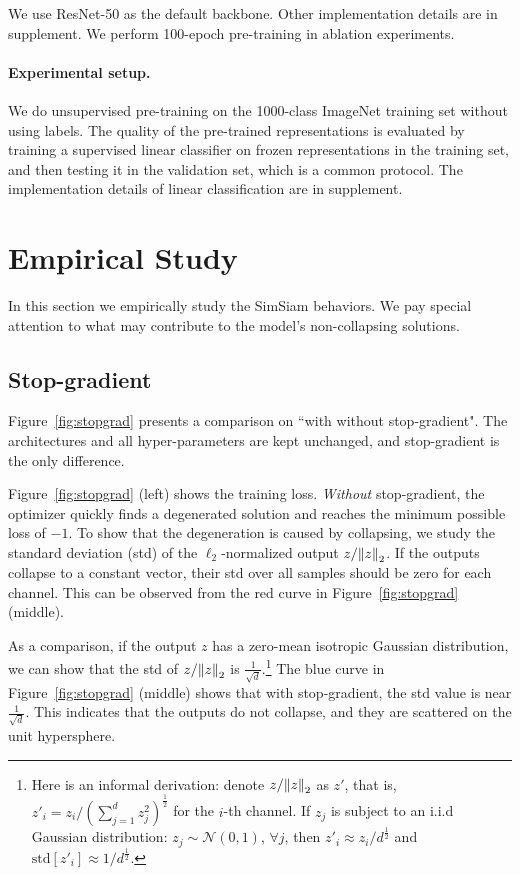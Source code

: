 \documentclass[final]{cvpr}
\newcommand{\z}{{z}}  %
\newcommand{\appdx}{supplement}
\begin{document}
\noindent We use ResNet-50 \cite{He2016} as the default backbone. Other implementation details are in \appdx. We perform 100-epoch pre-training in ablation experiments. 

\paragraph{Experimental setup.}
We do unsupervised pre-training on the 1000-class ImageNet training set \cite{Deng2009} without using labels. The quality of the pre-trained representations is evaluated by training a supervised linear classifier on frozen representations in the training set, and then testing it in the validation set, which is a common protocol. The implementation details of linear classification are in \appdx.

\section{Empirical Study\label{sec:exp}}

In this section we empirically study the SimSiam behaviors. We pay special attention to what may contribute to the model's non-collapsing solutions. 

\subsection{Stop-gradient}\label{subsec:stopgrad}

Figure~\ref{fig:stopgrad} presents a comparison on ``with \vs without stop-gradient". The architectures and all hyper-parameters are kept unchanged, and stop-gradient is the only difference.

Figure~\ref{fig:stopgrad} (left) shows the training loss. \emph{Without} stop-gradient, the optimizer quickly finds a degenerated solution and reaches the minimum possible loss of $-1$.
To show that the degeneration is caused by collapsing, we study the standard deviation (std) of the $\ell_2$-normalized output $\lnormv{\z}$. If the outputs collapse to a constant vector, their std over all samples should be zero for each channel.
This can be observed from the red curve in Figure~\ref{fig:stopgrad} (middle). 

As a comparison, if the output $\z$ has a zero-mean isotropic Gaussian distribution, we can show that the std of $\lnormv{\z}$ is $\frac{1}{\sqrt{d}}$.\footnote{
Here is an informal derivation:
denote $\lnormv{\z}$ as $\z'$, that is, $\z'_{i}\!=\!\z_{i} / (\sum_{j=1}^{d}\z^2_{j})^\frac{1}{2}$ for the $i$-th channel.
If $\z_{j}$ is subject to an i.i.d Gaussian distribution: $\z_{j}\!\sim\!\mathcal{N}(0, 1)$, $\forall j$, then $\z'_{i}\!\approx\!\z_{i} / d^\frac{1}{2}$ and $\text{{std}}[\z'_{i}]\!\approx\!1/d^\frac{1}{2}$.
} 
The blue curve in Figure~\ref{fig:stopgrad} (middle) shows that with stop-gradient, the std value is near $\frac{1}{\sqrt{d}}$. This indicates that the outputs do not collapse, and they are scattered on the unit hypersphere.
\end{document}
